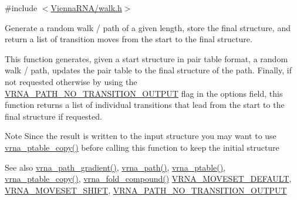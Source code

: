 {\ttfamily \#include $<$\hyperlink{walk_8h}{Vienna\+R\+N\+A/walk.\+h}$>$}



Generate a random walk / path of a given length, store the final structure, and return a list of transition moves from the start to the final structure. 

This function generates, given a start structure in pair table format, a random walk / path, updates the pair table to the final structure of the path. Finally, if not requested otherwise by using the \hyperlink{group__paths_ga1ee63e54ecf136491e12ff03ede2622d}{V\+R\+N\+A\+\_\+\+P\+A\+T\+H\+\_\+\+N\+O\+\_\+\+T\+R\+A\+N\+S\+I\+T\+I\+O\+N\+\_\+\+O\+U\+T\+P\+UT} flag in the {\ttfamily options} field, this function returns a list of individual transitions that lead from the start to the final structure if requested.

\begin{DoxyNote}{Note}
Since the result is written to the input structure you may want to use \hyperlink{group__struct__utils_ga2daefbbd6d9f8803731651882f54332d}{vrna\+\_\+ptable\+\_\+copy()} before calling this function to keep the initial structure
\end{DoxyNote}
\begin{DoxySeeAlso}{See also}
\hyperlink{group__paths_gae92cce443a8a64f7b7fb89867b7d6125}{vrna\+\_\+path\+\_\+gradient()}, \hyperlink{group__paths_gab6aee4143f8b103518d5cbfe6bfe5eae}{vrna\+\_\+path()}, \hyperlink{group__struct__utils_gae829fb8bb7f694c12a9c0bbc34c77c60}{vrna\+\_\+ptable()}, \hyperlink{group__struct__utils_ga2daefbbd6d9f8803731651882f54332d}{vrna\+\_\+ptable\+\_\+copy()}, \hyperlink{group__fold__compound_ga6601d994ba32b11511b36f68b08403be}{vrna\+\_\+fold\+\_\+compound()} \hyperlink{group__neighbors_gaa5ffec4dd0d02df320f123e6888154d1}{V\+R\+N\+A\+\_\+\+M\+O\+V\+E\+S\+E\+T\+\_\+\+D\+E\+F\+A\+U\+LT}, \hyperlink{group__neighbors_ga68ea27c81de4b74e48b775c04052590b}{V\+R\+N\+A\+\_\+\+M\+O\+V\+E\+S\+E\+T\+\_\+\+S\+H\+I\+FT}, \hyperlink{group__paths_ga1ee63e54ecf136491e12ff03ede2622d}{V\+R\+N\+A\+\_\+\+P\+A\+T\+H\+\_\+\+N\+O\+\_\+\+T\+R\+A\+N\+S\+I\+T\+I\+O\+N\+\_\+\+O\+U\+T\+P\+UT}
\end{DoxySeeAlso}

